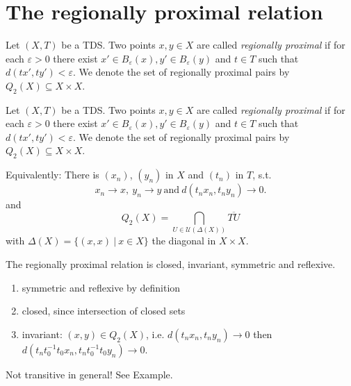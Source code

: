 \section{The regionally proximal relation}

\begin{frame}
  \begin{definition}
    \label{def:rpr}
    Let $(X, T)$ be a TDS.
    Two points $x,y \in X$ are called \emph{regionally proximal}
    if for each $\varepsilon > 0$ there exist $x' \in B_\varepsilon(x), y' \in B_\varepsilon(y)$
    and $t \in T$ such that $d(tx', ty') < \varepsilon$.
    We denote the set of regionally proximal pairs by $Q_2(X) \subseteq X \times X$.
  \end{definition}

  \begin{center}
    
  \end{center}
    
\end{frame}

\begin{frame}

  \begin{definition}
    \label{def:rpr}
    Let $(X, T)$ be a TDS.
    Two points $x,y \in X$ are called \emph{regionally proximal}
    if for each $\varepsilon > 0$ there exist $x' \in B_\varepsilon(x), y' \in B_\varepsilon(y)$
    and $t \in T$ such that $d(tx', ty') < \varepsilon$.
    We denote the set of regionally proximal pairs by $Q_2(X) \subseteq X \times X$.
  \end{definition}
  Equivalently: There is $(x_n)$, $(y_n)$ in $X$ and $(t_n)$ in $T$, s.t.
  \begin{equation*}
      \label{eq:rprchar}
      x_n \to x, \ y_n \to y \ \text{and} \ d(t_n x_n, t_n y_n) \to 0.
  \end{equation*} 
  and
  \begin{equation*}
    Q_2(X) = \bigcap_{U \in \mathcal{U}(\Delta(X))} \overline{TU} 
  \end{equation*}
  with $\Delta(X) = \{(x, x) \ | \ x \in X\}$ the diagonal in $X \times X$.
\end{frame}

\begin{frame}
\begin{theorem}
  The regionally proximal relation is closed, invariant, symmetric and reflexive.
\end{theorem}

\begin{enumerate}
  \item symmetric and reflexive by definition
  \item closed, since intersection of closed sets
  \item invariant: $(x, y) \in Q_2(X)$, i.e. $d(t_n x_n, t_n y_n) \to 0$ then $d(t_n t_0^{-1} t_0 x_n, t_n t_0^{-1} t_0 y_n) \to 0$.
\end{enumerate}

Not transitive in general! See Example.
\end{frame}

